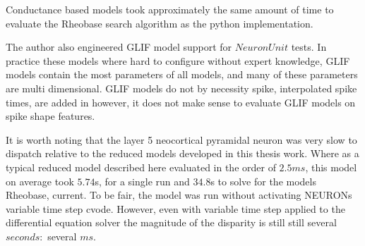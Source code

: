 Conductance based models took approximately the same amount of time to evaluate the Rheobase search algorithm as the python implementation.

The author also engineered GLIF model support for $NeuronUnit$ tests. In practice these models where hard to configure without expert knowledge, GLIF models contain the most parameters of all models, and many of these parameters are multi dimensional. GLIF models do not by necessity spike, interpolated spike times, are added in however, it does not make sense to evaluate GLIF models on spike shape features.

It is worth noting that the layer 5 neocortical pyramidal neuron was very slow to dispatch relative to the reduced models developed in this thesis work. Where as a typical reduced model described here evaluated in the order of $2.5 ms$, this model on average took $5.74$s, for a single run and $34.8$s to solve for the models Rheobase, current. To be fair, the model was run without activating NEURONs variable time step cvode. However, even with variable time step applied to the differential equation solver the magnitude of the disparity is still still several $seconds:$ several $ ms$. 



        








